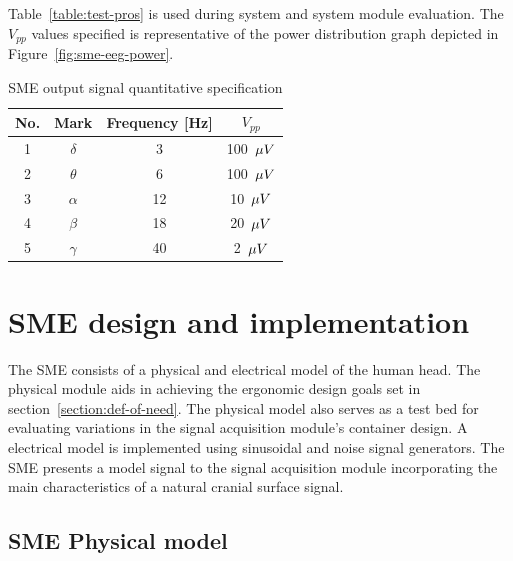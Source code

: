 Table~\vref{table:test-pros} is used during system and system module
evaluation. The $V_{pp}$ values specified is representative of the
power distribution graph depicted in Figure~\ref{fig:sme-eeg-power}.


\begin{table}
\begin{center}	
	\begin{tabular}[htpb]{|c|c|c|c|} \hline
	No. & Mark & Frequency [Hz]  & $V_{pp}$  \\ \hline
	1 & $\delta$ & 3 & 100~$\mu\/V$ \\
	2 & $\theta$ & 6 & 100~$\mu\/V$ \\
	3 & $\alpha$ & 12 & 10~$\mu\/V$ \\
	4 & $\beta$ & 18 & 20~$\mu\/V$ \\
	5 & $\gamma$ & 40 & 2~$\mu\/V$ \\
	\hline
	\end{tabular}
	\caption{SME output signal quantitative specification}
	\label{table:test-pros}
\end{center}	
\end{table}

\section{SME design and implementation}
The SME consists of a physical and electrical model of the human
head. The physical module aids in achieving the ergonomic design goals
set in section~\vref{section:def-of-need}. The physical model also
serves as a test bed for evaluating variations in the signal
acquisition module's container design. A electrical model is
implemented using sinusoidal and noise signal generators. The SME
presents a model signal to the signal acquisition module incorporating
the main characteristics of a natural cranial surface signal.

\subsection{SME Physical model}

